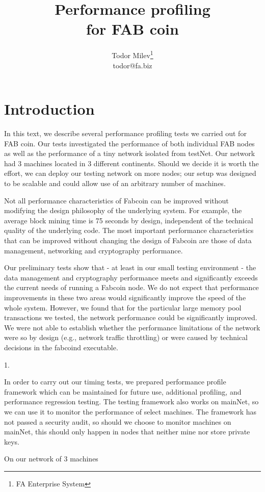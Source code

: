 \documentclass{article}
\title{
Performance profiling \\
for FAB coin
}
\author{Todor Milev\footnote{FA Enterprise System}\\ todor@fa.biz}
\begin{document}
\maketitle
\section{Introduction}
In this text, we describe several performance profiling tests we carried out for FAB coin. Our tests investigated the performance of both individual FAB nodes as well as the performance of a tiny network isolated from testNet. Our network had $3$ machines located in $3$ different continents. Should we decide it is worth the effort, we can deploy our testing network on more nodes; our setup was designed to be scalable and could allow use of an arbitrary number of machines.

Not all performance characteristics of Fabcoin can be improved without modifying the design philosophy of the underlying system. For example, the average block mining time is 75 seconds by design, independent of the technical quality of the underlying code. The most important performance characteristics that can be improved without changing the design of Fabcoin are those of data management, networking and cryptography performance. 

Our preliminary tests show that - at least in our small testing environment - the data management and cryptography performance meets and significantly exceeds the current needs of running a Fabcoin node. We do not expect that performance improvements in these two areas would significantly improve the speed of the whole system. However, we found that for the particular large memory pool transactions we tested, the network performance could be significantly improved. We were not able to establish whether the performance limitations of the network were so by design (e.g., network traffic throttling) or were caused by technical decisions in the fabcoind executable.

1. 

In order to carry out our timing tests, we prepared performance profile framework which can be maintained for future use, additional profiling, and performance regression testing. The testing framework also works on mainNet, so we can use it to monitor the performance of select machines. The framework has not passed a security audit, so should we choose to monitor machines on mainNet, this should only happen in nodes that neither mine nor store private keys.

On our network of 3 machines



\end{document}
